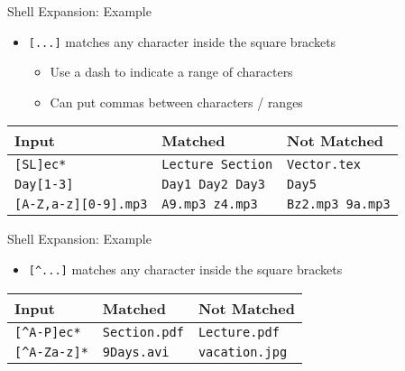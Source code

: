 \begin{frame}[fragile]{Shell Expansion: Example}
  \begin{itemize}
    \item \texttt{[...]} matches any character inside the square brackets
    \begin{itemize}
      \item Use a dash to indicate a range of characters
      \item Can put commas between characters / ranges
    \end{itemize}
  \end{itemize}
  \begin{center}
    {\small
    \begin{tabular}{|l|l|l|}
      \hline
      Input & Matched & Not Matched\\ \hline
      \texttt{[SL]ec*} & \texttt{Lecture Section} & \texttt{Vector.tex}\\ \hline
      \texttt{Day[1-3]} & \texttt{Day1 Day2 Day3} & \texttt{Day5}\\ \hline
      \texttt{[A-Z,a-z][0-9].mp3} & \texttt{A9.mp3 z4.mp3} & \texttt{Bz2.mp3 9a.mp3}\\ \hline
    \end{tabular}
    }
  \end{center}
\end{frame}

\begin{frame}[fragile]{Shell Expansion: Example}
  \begin{itemize}
    \item \texttt{[\^{}...]} matches any character  inside the square brackets
  \end{itemize}
  \begin{center}
    {\small
    \begin{tabular}{|l|l|l|}
      \hline
      Input & Matched & Not Matched\\ \hline
      \texttt{[\^{}A-P]ec*} & \texttt{Section.pdf} & \texttt{Lecture.pdf}\\ \hline
      \texttt{[\^{}A-Za-z]*} & \texttt{9Days.avi} & \texttt{vacation.jpg}\\ \hline
    \end{tabular}
    }
  \end{center}
\end{frame}

